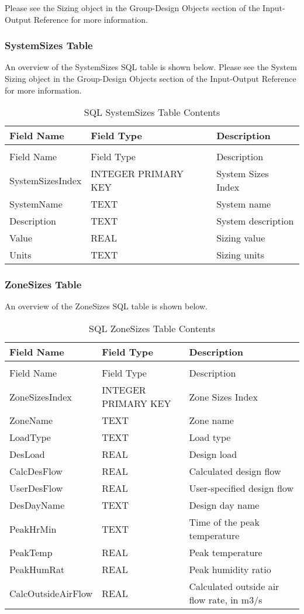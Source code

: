 Please see the Sizing object in the Group-Design Objects section of the Input-Output Reference for more information.

\subsubsection{SystemSizes Table}

An overview of the SystemSizes SQL table is shown below. Please see the System Sizing object in the Group-Design Objects section of the Input-Output Reference for more information.

\begin{longtable}[c]{@{}lll@{}}
\caption{SQL SystemSizes Table Contents \label{table:table-31.-sql-systemsizes-table-contents}} \tabularnewline
\toprule 
Field Name & Field Type & Description \tabularnewline
\midrule
\endfirsthead

\caption[]{SQL SystemSizes Table Contents} \tabularnewline
\toprule 
Field Name & Field Type & Description \tabularnewline
\midrule
\endhead

SystemSizes\-Index & INTEGER PRIMARY KEY & System Sizes Index \tabularnewline
SystemName & TEXT & System name \tabularnewline
Description & TEXT & System description \tabularnewline
Value & REAL & Sizing value \tabularnewline
Units & TEXT & Sizing units \tabularnewline
\bottomrule
\end{longtable}

\subsubsection{ZoneSizes Table}

An overview of the ZoneSizes SQL table is shown below.

\begin{longtable}[c]{>{\raggedright}p{1.5in}>{\raggedright}p{1.5in}>{\raggedright}p{3in}}
\caption{SQL ZoneSizes Table Contents \label{table:table-32.-sql-zonesizes-table-contents}} \tabularnewline
\toprule 
Field Name & Field Type & Description \tabularnewline
\midrule
\endfirsthead

\caption[]{SQL ZoneSizes Table Contents} \tabularnewline
\toprule 
Field Name & Field Type & Description \tabularnewline
\midrule
\endhead

ZoneSizes\-Index & INTEGER PRIMARY KEY & Zone Sizes Index \tabularnewline
ZoneName & TEXT & Zone name \tabularnewline
LoadType & TEXT & Load type \tabularnewline
DesLoad & REAL & Design load \tabularnewline
CalcDesFlow & REAL & Calculated design flow \tabularnewline
UserDesFlow & REAL & User-specified design flow \tabularnewline
DesDayName & TEXT & Design day name \tabularnewline
PeakHrMin & TEXT & Time of the peak temperature \tabularnewline
PeakTemp & REAL & Peak temperature \tabularnewline
PeakHumRat & REAL & Peak humidity ratio \tabularnewline
CalcOutside\-Air\-Flow & REAL & Calculated outside air flow rate, in m3/s \tabularnewline
\bottomrule
\end{longtable}

